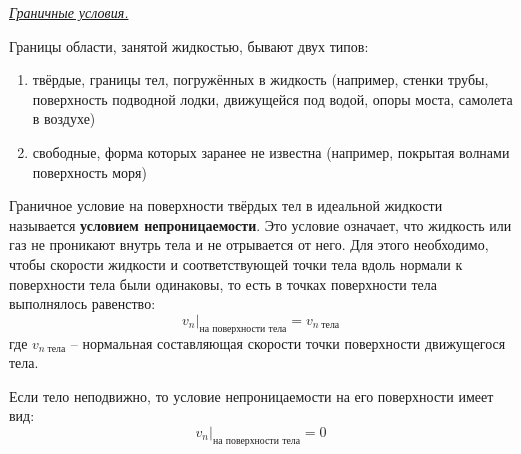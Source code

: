 \begin{center} \textit{\underline{Граничные условия.}} \end{center}

Границы области, занятой жидкостью, бывают двух типов:
\begin{enumerate}
  \item твёрдые, границы тел, погружённых в жидкость (например, стенки трубы, поверхность подводной лодки, движущейся под водой, опоры моста, самолета в воздухе)
  \item свободные, форма которых заранее не известна (например, покрытая волнами поверхность моря)
\end{enumerate}

\begin{defn}[Э-128] Граничное условие на поверхности твёрдых тел в идеальной жидкости называется \textbf{условием непроницаемости}. Это условие означает, что жидкость или газ не проникают внутрь тела и не отрывается от него.
  Для этого необходимо, чтобы скорости жидкости и соответствующей точки тела вдоль нормали к поверхности тела были одинаковы, то есть в точках поверхности тела выполнялось равенство:
  $$ \left. v_n \right|_{\text{на поверхности тела}} = v_{n \; \text{тела}}$$
  где $ v_{n \; \text{тела}} $ -- нормальная составляющая скорости точки поверхности движущегося тела.
\end{defn}

Если тело неподвижно, то условие непроницаемости на его поверхности имеет вид:
$$ \left. v_n \right|_{\text{на поверхности тела}} = 0 $$
